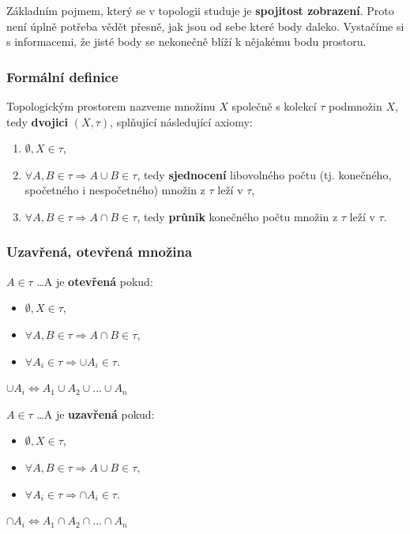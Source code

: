Základním pojmem, který se v topologii studuje je \textbf{spojitost zobrazení}. Proto není úplně potřeba vědět přesně, jak jsou od sebe které body daleko. Vystačíme si s informacemi, že jisté body se nekonečně blíží k nějakému bodu prostoru.

\subsubsection{Formální definice}
Topologickým prostorem nazveme množinu $X$ společně s kolekcí $\tau$ podmnožin $X$, tedy \textbf{dvojici} $(X, \tau)$, splňující následující axiomy:
\begin{enumerate}
\item $\emptyset, X \in \tau$,
\item $\forall A, B \in \tau \Rightarrow  A \cup B \in \tau $, tedy \textbf{sjednocení} libovolného počtu (tj. konečného, spočetného i nespočetného) množin z $\tau$ leží v $\tau$,
\item $\forall A, B \in \tau \Rightarrow A \cap B \in \tau $, tedy \textbf{průnik} konečného počtu množin z $\tau$ leží v $\tau$.
\end{enumerate}

\subsubsection{Uzavřená, otevřená množina}
\begin{minipage}[t]{0.49\textwidth}
$A \in \tau$ \ldots A je \textbf{otevřená} pokud:
\begin{itemize}
\item $\emptyset, X \in \tau$,
\item $\forall A, B \in \tau \Rightarrow  A \cap B \in \tau $,
\item $\forall A_i \in \tau \Rightarrow \cup A_i \in \tau $.
\end{itemize}
$\cup A_i \Leftrightarrow A_1 \cup A_2 \cup ... \cup A_n $
\end{minipage}
\begin{minipage}[t]{0.49\textwidth}
$A \in \tau$ \ldots A je \textbf{uzavřená} pokud:
\begin{itemize}
\item $\emptyset, X \in \tau$,
\item $\forall A, B \in \tau \Rightarrow  A \cup B \in \tau $,
\item $\forall A_i \in \tau \Rightarrow \cap A_i \in \tau $.
\end{itemize}
$\cap A_i \Leftrightarrow A_1 \cap A_2 \cap ... \cap A_n $
\end{minipage}

